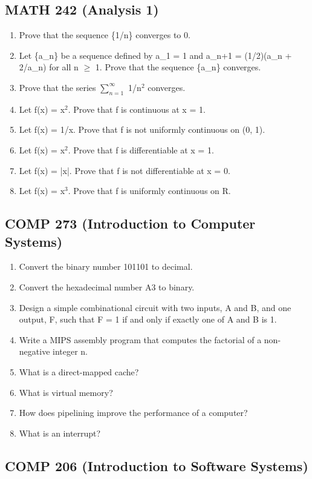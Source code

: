 \documentclass{article}
\begin{document}
\subsection*{MATH 242 (Analysis 1)}

\begin{enumerate}
\item Prove that the sequence \{1/n\} converges to 0.
\item Let \{a\_n\} be a sequence defined by a\_1 = 1 and a\_{n+1} = (1/2)(a\_n + 2/a\_n) for all n $\geq$ 1. Prove that the sequence \{a\_n\} converges.
\item Prove that the series $\sum_{n=1}^\infty$ 1/n$^2$ converges.
\item Let f(x) = x$^2$. Prove that f is continuous at x = 1.
\item Let f(x) = 1/x. Prove that f is not uniformly continuous on (0, 1).
\item Let f(x) = x$^2$. Prove that f is differentiable at x = 1.
\item Let f(x) = |x|. Prove that f is not differentiable at x = 0.
\item Let f(x) = x$^3$. Prove that f is uniformly continuous on R.
\end{enumerate}

\subsection*{COMP 273 (Introduction to Computer Systems)}

\begin{enumerate}
\item Convert the binary number 101101 to decimal.
\item Convert the hexadecimal number A3 to binary.
\item Design a simple combinational circuit with two inputs, A and B, and one output, F, such that F = 1 if and only if exactly one of A and B is 1.
\item Write a MIPS assembly program that computes the factorial of a non-negative integer n.
\item What is a direct-mapped cache?
\item What is virtual memory?
\item How does pipelining improve the performance of a computer?
\item What is an interrupt?
\end{enumerate}

\subsection*{COMP 206 (Introduction to Software Systems)}
\end{document}
